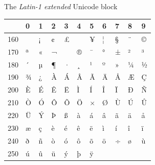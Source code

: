 \documentclass[a4paper]{article}
\newlength{\DUtablewidth} %
\providecommand*{\DUroletitlereference}[1]{\textsl{#1}}
\begin{document}
The \DUroletitlereference{Latin-1 extended} Unicode block

\setlength{\DUtablewidth}{\linewidth}
\begin{longtable*}[c]{|p{0.051\DUtablewidth}|p{0.028\DUtablewidth}|p{0.028\DUtablewidth}|p{0.028\DUtablewidth}|p{0.028\DUtablewidth}|p{0.028\DUtablewidth}|p{0.028\DUtablewidth}|p{0.028\DUtablewidth}|p{0.028\DUtablewidth}|p{0.028\DUtablewidth}|p{0.028\DUtablewidth}|}
\hline

% 
 & 
0
 & 
1
 & 
2
 & 
3
 & 
4
 & 
5
 & 
6
 & 
7
 & 
8
 & 
9
 \\
\hline

160
 &  & 
¡
 & 
¢
 & 
£
 &  & 
¥
 & 
¦
 & 
§
 & 
¨
 & 
©
 \\
\hline

170
 & 
ª
 & 
«
 & 
¬
 & 
\-
 & 
®
 & 
¯
 & 
°
 & 
±
 & 
²
 & 
³
 \\
\hline

180
 & 
´
 & 
µ
 & 
¶
 & 
·
 & 
¸
 & 
¹
 & 
º
 & 
»
 & 
¼
 & 
½
 \\
\hline

190
 & 
¾
 & 
¿
 & 
À
 & 
Á
 & 
Â
 & 
Ã
 & 
Ä
 & 
Å
 & 
Æ
 & 
Ç
 \\
\hline

200
 & 
È
 & 
É
 & 
Ê
 & 
Ë
 & 
Ì
 & 
Í
 & 
Î
 & 
Ï
 & 
Ð
 & 
Ñ
 \\
\hline

210
 & 
Ò
 & 
Ó
 & 
Ô
 & 
Õ
 & 
Ö
 & 
×
 & 
Ø
 & 
Ù
 & 
Ú
 & 
Û
 \\
\hline

220
 & 
Ü
 & 
Ý
 & 
Þ
 & 
ß
 & 
à
 & 
á
 & 
â
 & 
ã
 & 
ä
 & 
å
 \\
\hline

230
 & 
æ
 & 
ç
 & 
è
 & 
é
 & 
ê
 & 
ë
 & 
ì
 & 
í
 & 
î
 & 
ï
 \\
\hline

240
 & 
ð
 & 
ñ
 & 
ò
 & 
ó
 & 
ô
 & 
õ
 & 
ö
 & 
÷
 & 
ø
 & 
ù
 \\
\hline

250
 & 
ú
 & 
û
 & 
ü
 & 
ý
 & 
þ
 & 
ÿ
 &  &  &  &  \\
\hline
\end{longtable*}
%
\end{document}
